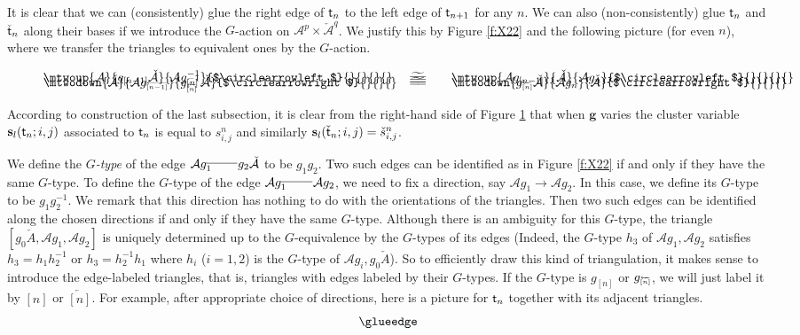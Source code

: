 \documentclass{amsart}
\theoremstyle{definition}
\theoremstyle{remark}
\numberwithin{equation}{section}
\newcommand{\mc}[1]{\mathcal{#1}}
\newcommand{\mch}[1]{\check{\mathcal{#1}}}
\renewcommand{\b}[1]{\bold{#1}}
\newcommand{\bs}[1]{\boldsymbol{#1}}
\newcommand{\wtd}[1]{\widetilde{#1}}
\renewcommand{\t}{{\sf t}}
\newcommand{\invint}[1]{{\scriptsize \overleftarrow{[#1]}}}
\newcommand{\ijn}{_{i,j}^{n}}
\newcommand{\bigsimeq}{\wtd{=\joinrel=}}
\begin{document}
It is clear that we can (consistently) glue the right edge of $\t_n$ to the left edge of $\t_{n+1}$ for any $n$.
We can also (non-consistently) glue $\t_n$ and $\check{\t}_n$ along their bases if we introduce the $G$-action on $\mc{A}^p\times \mch{A}^q$.
We justify this by Figure \ref{f:X22} and the following picture (for even $n$),
where we transfer the triangles to equivalent ones by the $G$-action.   
\begin{figure}[!h]
\begin{align*} 
&\mtwoup{\mc{A}}{g_{[n-1]}\mch{A}}{\mc{A}g_{[n]}^{-1}}{$\circlearrowleft$}{}{}{}{} & \bigsimeq & \qquad \mtwoup{\mc{A}g_{[n-1]}}{\mch{A}}{\mc{A}g_{n}}{$\circlearrowleft$}{}{}{}{} \\[-0.2in]
&\mtwodown{\mch{A}}{\mc{A}g_{\invint{n-1}}}{g_{\invint{n}}^{-1}\mch{A}}{$\circlearrowright$}{}{}{} & \bigsimeq & \qquad \mtwodown{g_{\invint{n}}\mch{A}}{\mc{A}g_{n}}{\mch{A}}{$\circlearrowright$}{}{}{} 
\end{align*} \caption{} \label{f:gluedual}
\end{figure}
According to construction of the last subsection, 
it is clear from the right-hand side of Figure \ref{f:gluedual} that when $\bs{g}$ varies the cluster variable $\b{s}_l(\t_n;i,j)$ associated to $\t_n$ is equal to $s\ijn$ and similarly $\b{s}_l(\check{\t}_n;i,j)=\check{s}\ijn$.

We define the {\em $G$-type} of the edge $\mc{A}g_1  ^{\line(1,0){25}} g_2\mch{A}$ to be $g_1g_2$.
Two such edges can be identified as in Figure \ref{f:X22} if and only if they have the same $G$-type.
To define the $G$-type of the edge $\mc{A}g_1 ^{\line(1,0){25}} \mc{A}g_2$, we need to fix a direction, say $\mc{A}g_1 \!\!\longrightarrow\!\! \mc{A}g_2$.
In this case, we define its $G$-type to be $g_1g_2^{-1}$.
We remark that this direction has nothing to do with the orientations of the triangles.
Then two such edges can be identified along the chosen directions if and only if they have the same $G$-type.
Although there is an ambiguity for this $G$-type, the triangle $[g_0\check{A},\mc{A}g_1,\mc{A}g_2]$ is uniquely determined up to the $G$-equivalence by the $G$-types of its edges (Indeed, the $G$-type $h_3$ of $\mc{A}g_1,\mc{A}g_2$ satisfies $h_3=h_1h_2^{-1}$ or $h_3=h_2^{-1}h_1$ where $h_i$ ($i=1,2$) is the $G$-type of $\mc{A}g_i,g_0\check{A}$).
So to efficiently draw this kind of triangulation, it makes sense to introduce the edge-labeled triangles, that is, triangles with edges labeled by their $G$-types. 
If the $G$-type is $g_{[n]}$ or $g_{\invint{n}}$, we will just label it by $[n]$ or $\overleftarrow{[n]}$.
For example, after appropriate choice of directions, here is a picture for $\t_n$ together with its adjacent triangles.
$$\glueedge$$ 
\end{document}
